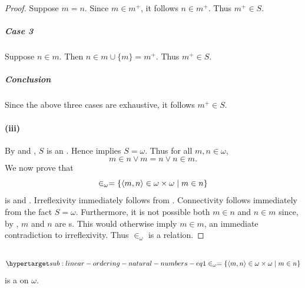\documentclass{report}
\begin{document}
\begin{proof}
        Suppose $m = n$.
        Since $m \in m^+$, it follows $n \in m^+$.
        Thus $m^+ \in S$.

      \subparagraph{Case 3}%

        Suppose $n \in m$.
        Then $n \in m \cup \{m\} = m^+$.
        Thus $m^+ \in S$.

      \subparagraph{Conclusion}%

        Since the above three cases are exhaustive, it follows $m^+ \in S$.

    \paragraph{(iii)}%

      By  and
        , $S$ is an
        .
      Hence  implies $S = \omega$.
      Thus for all $m, n \in \omega$, $$m \in n \lor m = n \lor n \in m.$$
      We now prove that
        $$\in_\omega = \{\left< m, n \right> \in \omega \times \omega \mid m \in n\}$$
        is  and .
      Irreflexivity immediately follows from .
      Connectivity follows immediately from the fact $S = \omega$.
      Furthermore, it is not possible both $m \in n$ and $n \in m$ since, by
        , $m$ and $n$ are s.
      This would otherwise imply $m \in m$, an immediate contradiction to
        irreflexivity.
      Thus $\in_\omega$ is a  relation.

  \end{proof}

\subsection{}%

  \begin{theorem}
      \begin{equation}
        \hyperlabel{sub:linear-ordering-natural-numbers-eq1}
        \in_\omega = \{\tuple{m, n} \in \omega \times \omega \mid m \in n\}
      \end{equation}
      is a  on $\omega$.
  \end{theorem}
\end{document}
